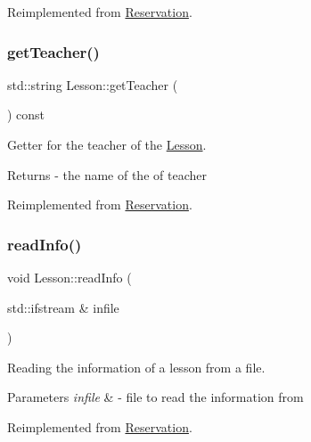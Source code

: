 Reimplemented from \mbox{\hyperlink{class_reservation_a62cdb2f1a24e2fce92fb9f024ae9f494}{Reservation}}.

\mbox{\label{class_lesson_ae0681fd75bb70c1b91f0a1999524c5ce}} 
\subsubsection{\texorpdfstring{get\+Teacher()}{getTeacher()}}
{\footnotesize\ttfamily std\+::string Lesson\+::get\+Teacher (\begin{DoxyParamCaption}{ }\end{DoxyParamCaption}) const\hspace{0.3cm}{\ttfamily [virtual]}}



Getter for the teacher of the \mbox{\hyperlink{class_lesson}{Lesson}}. 

\begin{DoxyReturn}{Returns}
-\/ the name of the of teacher 
\end{DoxyReturn}


Reimplemented from \mbox{\hyperlink{class_reservation}{Reservation}}.

\mbox{\label{class_lesson_a3ac64e2f79bc9e381634d5d30499e8f1}} 
\subsubsection{\texorpdfstring{read\+Info()}{readInfo()}}
{\footnotesize\ttfamily void Lesson\+::read\+Info (\begin{DoxyParamCaption}\item[{std\+::ifstream \&}]{infile }\end{DoxyParamCaption})\hspace{0.3cm}{\ttfamily [virtual]}}



Reading the information of a lesson from a file. 


\begin{DoxyParams}{Parameters}
{\em infile} & -\/ file to read the information from \\
\hline
\end{DoxyParams}


Reimplemented from \mbox{\hyperlink{class_reservation_acff32024a350c2156af9f74522c59b7b}{Reservation}}.


